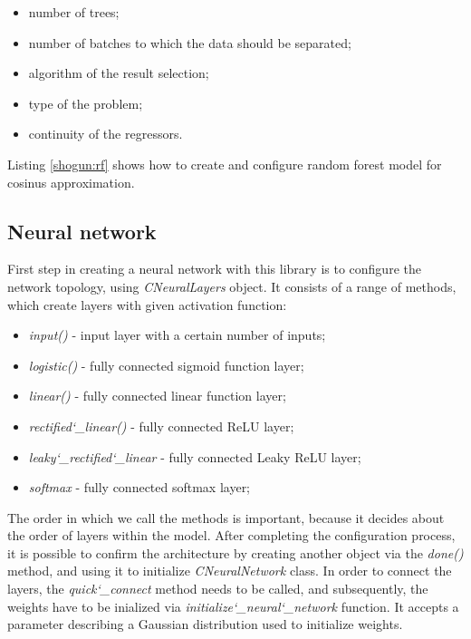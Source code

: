 \begin{itemize}
	\item number of trees;
	\item number of batches to which the data should be separated;
	\item algorithm of the result selection;
	\item type of the problem;
	\item continuity of the regressors.
\end{itemize}

Listing \ref{shogun:rf} shows how to create and configure random forest model for cosinus approximation.


\subsection{Neural network}

First step in creating a neural network with this library is to configure the network topology, using \textit{CNeuralLayers} object. It consists of a range of methods, which create layers with given activation function:

\begin{itemize}
	\item \textit{input()} - input layer with a certain number of inputs;
	\item \textit{logistic()} - fully connected sigmoid function layer;
	\item \textit{linear()} - fully connected linear function layer;
	\item \textit{rectified\char`_linear()} - fully connected ReLU layer;
	\item \textit{leaky\char`_rectified\char`_linear} - fully connected Leaky ReLU layer;
	\item \textit{softmax} - fully connected softmax layer;
\end{itemize}

The order in which we call the methods is important, because it decides about the order of layers within the model. After completing the configuration process, it is possible to confirm the architecture by creating another object via the \textit{done()} method, and using it to initialize \textit{CNeuralNetwork} class. In order to connect the layers, the \textit{quick\char`_connect} method needs to be called, and subsequently, the weights have to be inialized via \textit{initialize\char`_neural\char`_network} function. It accepts a parameter describing a Gaussian distribution used to initialize weights.




